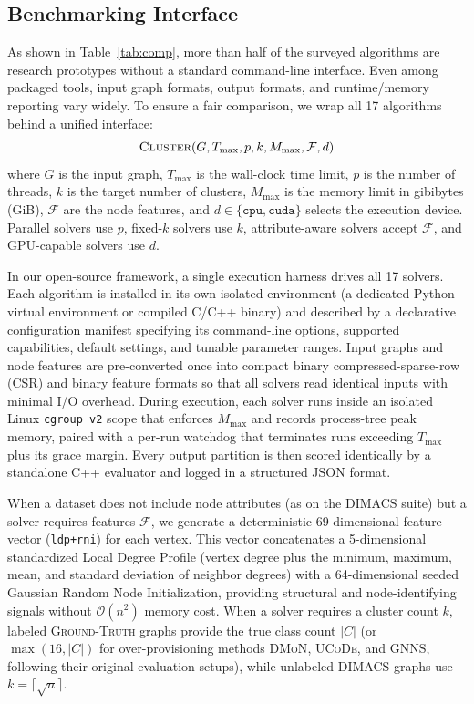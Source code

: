 \documentclass[11pt,a4paper]{article}
\begin{document}
\subsection{Benchmarking Interface}\label{sec:evaluation}

As shown in Table~\ref{tab:comp}, more than half of the surveyed algorithms are research prototypes without a standard command-line interface. Even among packaged tools, input graph formats, output formats, and runtime/memory reporting vary widely. To ensure a fair comparison, we wrap all 17 algorithms behind a unified interface:
\[\textsc{Cluster}(G, T_{\max}, p, k, M_{\max}, \mathcal{F}, d)\]
where $G$ is the input graph, $T_{\max}$ is the wall-clock time limit, $p$ is the number of threads, $k$ is the target number of clusters, $M_{\max}$ is the memory limit in gibibytes (GiB), $\mathcal{F}$ are the node features, and $d \in \{\texttt{cpu}, \texttt{cuda}\}$ selects the execution device. Parallel solvers use $p$, fixed-$k$ solvers use $k$, attribute-aware solvers accept $\mathcal{F}$, and GPU-capable solvers use $d$.

In our open-source framework, a single execution harness drives all 17 solvers. Each algorithm is installed in its own isolated environment (a dedicated Python virtual environment or compiled C/C++ binary) and described by a declarative configuration manifest specifying its command-line options, supported capabilities, default settings, and tunable parameter ranges. Input graphs and node features are pre-converted once into compact binary compressed-sparse-row (CSR) and binary feature formats so that all solvers read identical inputs with minimal I/O overhead. During execution, each solver runs inside an isolated Linux \texttt{cgroup v2} scope that enforces $M_{\max}$ and records process-tree peak memory, paired with a per-run watchdog that terminates runs exceeding $T_{\max}$ plus its grace margin. Every output partition is then scored identically by a standalone C++ evaluator and logged in a structured JSON format.

When a dataset does not include node attributes (as on the \textsc{DIMACS} suite) but a solver requires features $\mathcal{F}$, we generate a deterministic 69-dimensional feature vector (\texttt{ldp+rni}) for each vertex. This vector concatenates a 5-dimensional standardized Local Degree Profile (vertex degree plus the minimum, maximum, mean, and standard deviation of neighbor degrees) with a 64-dimensional seeded Gaussian Random Node Initialization, providing structural and node-identifying signals without $\mathcal{O}(n^2)$ memory cost. When a solver requires a cluster count $k$, labeled \textsc{Ground-Truth} graphs provide the true class count $|C|$ (or $\max(16, |C|)$ for over-provisioning methods \textsc{DMoN}, \textsc{UCoDe}, and \textsc{GNNS}, following their original evaluation setups), while unlabeled \textsc{DIMACS} graphs use $k = \lceil\sqrt{n}\rceil$.
\end{document}
